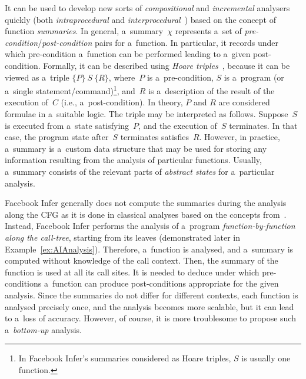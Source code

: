 It can be used to develop new sorts of \emph{compositional} and \emph{incremental} analysers quickly (both \emph{intraprocedural} and \emph{interprocedural}~\cite{programAnalysisNielson}) based on the concept of function \emph{summaries}. In general, a~summary~$ \chi $ represents a~set of \emph{pre-condition}/\emph{post-condition} pairs for a~function. In particular, it records under which pre-condition a~function can be performed leading to a~given post-condition. Formally, it can be described using \emph{Hoare triples}~\cite{hoare}, because it can be viewed as a~triple $ \{P\}\ S\ \{R\} $, where~$ P $ is a~pre-condition, $ S $ is a~program (or a~single statement/command)\footnote{In Facebook Infer's summaries considered as Hoare triples, $ S $ is usually one function.}, and~$ R $ is a~description of the result of the execution of~$ C $ (i.e., a~post-condition). In theory, $ P $ and $ R $ are considered formulae in a~suitable logic. The triple may be interpreted as follows. Suppose~$ S $ is executed from a~state satisfying~$ P $, and the execution of~$ S $ terminates. In that case, the program state after~$ S $ terminates satisfies~$ R $. However, in practice, a~summary is a~custom data structure that may be used for storing any information resulting from the analysis of particular functions. Usually, a~summary consists of the relevant parts of \emph{abstract states} for a~particular analysis.

Facebook Infer generally does not compute the summaries during the analysis along the CFG as it is done in classical analyses based on the concepts from~\cite{DFAGraphReach, DFAApproaches}. Instead, Facebook Infer performs the analysis of a~program \emph{function-by-function along the call-tree}, starting from its leaves (demonstrated later in Example~\ref{ex:AIAnalysis}). Therefore, a~function is analysed, and a~summary is computed without knowledge of the call context. Then, the summary of the function is used at all its call sites. It is needed to deduce under which pre-conditions a~function can produce post-conditions appropriate for the given analysis. Since the summaries do not differ for different contexts, each function is analysed precisely once, and the analysis becomes more scalable, but it can lead to a~loss of accuracy. However, of course, it is more troublesome to propose such a~\emph{bottom-up} analysis.

